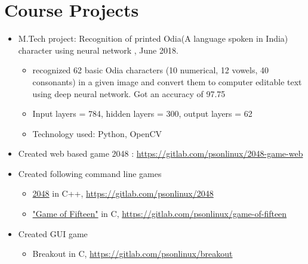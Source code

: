 \documentclass[a4paper,10pt]{article}
\begin{document}
	\section{Course Projects}
	\begin{itemize}
				\item M.Tech project: Recognition of printed Odia(A language spoken in India) character using neural network , June 2018.
				\begin{itemize}
				    \item recognized 62 basic Odia characters (10 numerical, 12 vowels, 40 consonants) in a given image and convert them to computer editable text using deep neural network. Got an accuracy of 97.75
				    \item Input layers = 784, hidden layers = 300, output layers = 62
				    \item Technology used: Python, OpenCV
				\end{itemize}
                \item Created web based game 2048 : \url{https://gitlab.com/psonlinux/2048-game-web}
				\item Created following command line games
				    \begin{itemize}
				        \item \href{https://en.wikipedia.org/wiki/2048_(video_game)}{2048} in C++, \url{https://gitlab.com/psonlinux/2048}
				        \item \href{https://en.wikipedia.org/wiki/15_puzzle}{"Game of Fifteen"} in C, \url{https://gitlab.com/psonlinux/game-of-fifteen}
				    \end{itemize}
				\item Created GUI game
				    \begin{itemize}
				        \item Breakout in C, \url{https://gitlab.com/psonlinux/breakout}
				    \end{itemize}
			\end{itemize}
			
\end{document}
